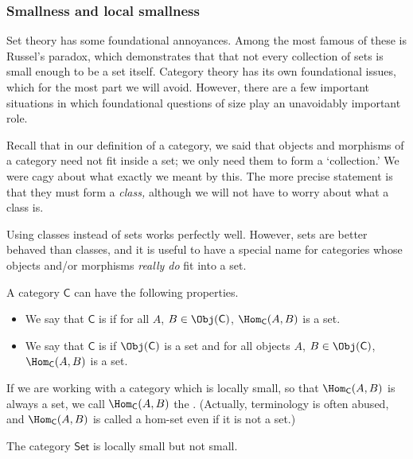 \documentclass[notes.tex]{subfiles}
\begin{document}
\subsubsection{Smallness and local smallness}

Set theory has some foundational annoyances. Among the most famous of these is Russel's paradox, which demonstrates that that not every collection of sets is small enough to be a set itself. Category theory has its own foundational issues, which for the most part we will avoid. However, there are a few important situations in which foundational questions of size play an unavoidably important role.

Recall that in our definition of a category, we said that objects and morphisms of a category need not fit inside a set; we only need them to form a `collection.' We were cagy about what exactly we meant by this. The more precise statement is that they must form a \emph{class,} although we will not have to worry about what a class is.

Using classes instead of sets works perfectly well. However, sets are better behaved than classes, and it is useful to have a special name for categories whose objects and/or morphisms \emph{really do} fit into a set.

\begin{definition}
  \label{def:smalllocallysmallcategoryhomset}
  A category $\mathsf{C}$ can have the following properties.
  \begin{itemize}
    \item We say that $\mathsf{C}$ is  if for all $A$, $B \in \Obj(\mathsf{C})$, $\Hom_{\mathsf{C}}(A, B)$ is a set.

    \item We say that $\mathsf{C}$ is  if $\Obj(\mathsf{C})$ is a set and for all objects $A$, $B \in \Obj(\mathsf{C})$, $\Hom_{\mathsf{C}}(A, B)$ is a set.
  \end{itemize}
\end{definition}

If we are working with a category which is locally small, so that $\Hom_{\mathsf{C}}(A,B)$ is always a set, we call $\Hom_{\mathsf{C}}(A, B)$ the . (Actually, terminology is often abused, and $\Hom_{\mathsf{C}}(A, B)$ is called a hom-set even if it is not a set.)

\begin{example}
  The category $\mathsf{Set}$ is locally small but not small.
\end{example}
\end{document}

